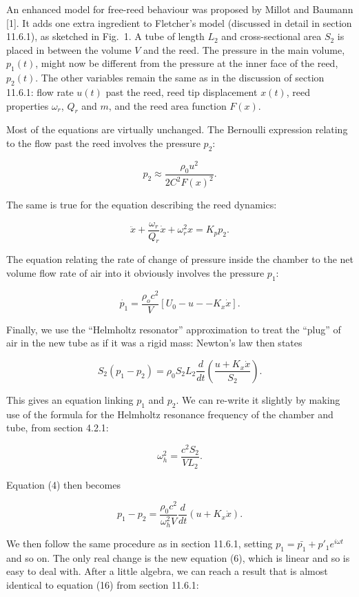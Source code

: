   An enhanced model for free-reed behaviour was proposed by Millot and Baumann 
  [1]. It adds one extra ingredient to Fletcher's model (discussed in detail in 
  section 11.6.1), as sketched in Fig.\ 1. A tube of length $L_2$ and 
  cross-sectional area $S_2$ is placed in between the volume $V$ and the reed. 
  The pressure in the main volume, $p_1(t)$, might now be different from the 
  pressure at the inner face of the reed, $p_2(t)$. The other variables remain 
  the same as in the discussion of section 11.6.1: flow rate $u(t)$ past the 
  reed, reed tip displacement $x(t)$, reed properties $\omega_r$, $Q_r$ and 
  $m$, and the reed area function $F(x)$. 

  Most of the equations are virtually unchanged. The Bernoulli expression 
  relating to the flow past the reed involves the pressure $p_2$: 

  $$p_2 \approx \dfrac{\rho_0 u^2}{2 C^2 F(x)^2} . \tag{1}$$ 

  The same is true for the equation describing the reed dynamics: 

  $$\ddot{x}+\dfrac{\omega_r}{Q_r}\dot{x}+\omega_r^2 x = K_p p_2 . \tag{2}$$ 

  The equation relating the rate of change of pressure inside the chamber to 
  the net volume flow rate of air into it obviously involves the pressure 
  $p_1$: 

  $$\dot{p_1}=\dfrac{\rho_o c^2}{V}[U_0 -u -- K_x \dot{x}] . \tag{3}$$ 

  Finally, we use the ``Helmholtz resonator'' approximation to treat the 
  ``plug'' of air in the new tube as if it was a rigid mass: Newton's law then 
  states 

  $$S_2(p_1-p_2)=\rho_0 S_2 L_2\dfrac{d}{dt}\left(\dfrac{u+K_x \dot{x}}{S_2} 
  \right) . \tag{4}$$ 

  This gives an equation linking $p_1$ and $p_2$. We can re-write it slightly 
  by making use of the formula for the Helmholtz resonance frequency of the 
  chamber and tube, from section 4.2.1: 

  $$\omega_h^2=\dfrac{c^2 S_2}{VL_2} . \tag{5}$$ 

  Equation (4) then becomes 

  $$p_1-p_2=\dfrac{\rho_0 c^2}{\omega_h^2 V} \dfrac{d}{dt}\left(u+K_x \dot{x} 
  \right) . \tag{6}$$ 

  We then follow the same procedure as in section 11.6.1, setting 
  $p_1=\bar{p_1}+ p'_1 e^{i \omega t}$ and so on. The only real change is the 
  new equation (6), which is linear and so is easy to deal with. After a little 
  algebra, we can reach a result that is almost identical to equation (16) from 
  section 11.6.1: 

